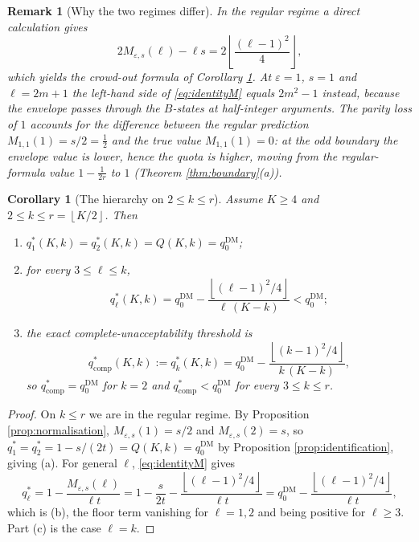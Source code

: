 \documentclass[11pt]{article}
\theoremstyle{plain}
\newtheorem{corollary}{Corollary}
\newtheorem{remark}{Remark}
\theoremstyle{definition}
\newcommand{\fl}[1]{\left\lfloor #1\right\rfloor}
\newcommand{\eps}{\varepsilon}
\newcommand{\DM}{\mathrm{DM}}
\begin{document}
\begin{remark}[Why the two regimes differ]
\label{rem:boundaryidentity}
In the regular regime a direct calculation gives
\begin{equation}
\label{eq:identityM}
2M_{\eps,s}(\ell)-\ell s=2\fl{\frac{(\ell-1)^2}{4}},
\end{equation}
which yields the crowd-out formula of Corollary \ref{cor:hierarchy}. At $\eps=1$, $s=1$ and $\ell=2m+1$ the left-hand side of \eqref{eq:identityM} equals $2m^2-1$ instead, because the envelope passes through the $B$-states at half-integer arguments. The parity loss of $1$ accounts for the difference between the regular prediction $M_{1,1}(1)=s/2=\tfrac12$ and the true value $M_{1,1}(1)=0$: at the odd boundary the envelope value is \emph{lower}, hence the quota is \emph{higher}, moving from the regular-formula value $1-\frac{1}{2r}$ to $1$ (Theorem \ref{thm:boundary}(a)).
\end{remark}

\begin{corollary}[The hierarchy on $2\le k\le r$]
\label{cor:hierarchy}
Assume $K\ge4$ and $2\le k\le r=\fl{K/2}$. Then
\begin{enumerate}[label=(\alph*)]
\item $q_1^*(K,k)=q_2^*(K,k)=Q(K,k)=q_0^{\DM}$;
\item for every $3\le\ell\le k$,
\[
q_\ell^*(K,k)=q_0^{\DM}-\frac{\fl{(\ell-1)^2/4}}{\ell\,(K-k)}<q_0^{\DM};
\]
\item the exact complete-unacceptability threshold is
\[
q_{\mathrm{comp}}^*(K,k):=q_k^*(K,k)=q_0^{\DM}-\frac{\fl{(k-1)^2/4}}{k\,(K-k)} ,
\]
so $q_{\mathrm{comp}}^*=q_0^{\DM}$ for $k=2$ and $q_{\mathrm{comp}}^*<q_0^{\DM}$ for every $3\le k\le r$.
\end{enumerate}
\end{corollary}

\begin{proof}
On $k\le r$ we are in the regular regime. By Proposition \ref{prop:normalisation}, $M_{\eps,s}(1)=s/2$ and $M_{\eps,s}(2)=s$, so $q_1^*=q_2^*=1-s/(2t)=Q(K,k)=q_0^{\DM}$ by Proposition \ref{prop:identification}, giving (a). For general $\ell$, \eqref{eq:identityM} gives
\[
q_\ell^*=1-\frac{M_{\eps,s}(\ell)}{\ell t}=1-\frac{s}{2t}-\frac{\fl{(\ell-1)^2/4}}{\ell t}=q_0^{\DM}-\frac{\fl{(\ell-1)^2/4}}{\ell t},
\]
which is (b), the floor term vanishing for $\ell=1,2$ and being positive for $\ell\ge3$. Part (c) is the case $\ell=k$.
\end{proof}
\end{document}
